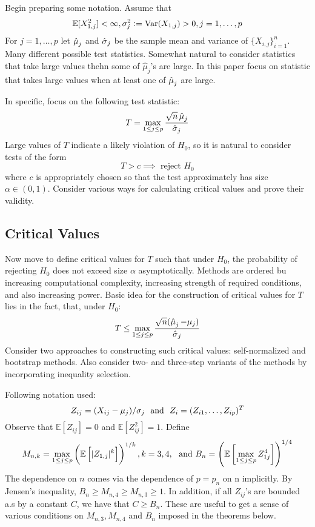 Begin preparing some notation. Assume that 
\begin{equation}
	\label{eq:CCK-12}
	\mathbb{E}[X_{1,j}^2] < \infty, \sigma_j^2 := \operatorname{Var}(X_{1,j}) > 0, j = 1,\dots, p
\end{equation}
For $j = 1,\dots,p$ let $\operatorname{\hat{\mu}}_j$ and $\operatorname{\hat{\sigma}}_j$ be the sample mean and variance of $\{X_{i,j}\}_{i=1}^n$. Many different possible test statistics. Somewhat natural to consider statistics that take large values thehn some of $\hat{\mu}_j$'s are large. In this paper focus on statistic that takes large values when at least one of $\operatorname{\hat{\mu}}_j$ are large. 

In specific, focus on the following test statistic:
\begin{equation}
	\label{2:testStat}
	T = \max_{1\leq j \leq p}\frac{\sqrt{n}\operatorname{\hat{\mu}}_j}{\operatorname{\hat{\sigma}}_j}
\end{equation}
Large values of $T$ indicate a likely violation of $H_0$, so it is natural to consider tests of the form 
\[T > c \implies \text{ reject } H_0\]
where $c$ is appropriately chosen so that the test approximately has size $\alpha \in (0,1)$. Consider various ways for calculating critical values and prove their validity. 

\subsection{Critical Values}

Now move to define critical values for $T$ such that under $H_0$, the probability of rejecting $H_0$ does not exceed size $\alpha$ asymptotically. Methods are ordered bu increasing computational complexity, increasing strength of required conditions, and also increasing power. Basic idea for the construction of critical values for $T$ lies in the fact, that, under $H_0$:
\[T \leq \max_{1\leq j \leq p} \frac{\sqrt{n}(\operatorname{\hat{\mu}}_j - \mu_j)}{\operatorname{\hat{\sigma}}_j} \]
Consider two approaches to constructing such critical values: self-normalized and bootstrap methods. Also consider two- and three-step variants of the methods by incorporating inequality selection. 

Following notation used:
\[Z_{ij} = (X_{ij} - \mu_j)/\sigma_j\hbox{ }\text{ and }\hbox{ }Z_i = (Z_{i1}, \dots, Z_{ip})^T \]
Observe that $\mathbb{E}[Z_{ij}] = 0$ and $\mathbb{E}[Z_{ij}^2] = 1$. Define 
\[M_{n,k} = \max_{1\leq j \leq p}\left( \mathbb{E}\left[|Z_{1,j}|^k\right]   \right)^{1/k},k = 3,4,\hbox{ }\text{ and }B_n = \left(\mathbb{E}\left[\max_{1\leq j \leq p} Z_{1j}^4     \right]   \right)^{1/4} \]
The dependence on $n$ comes via the dependence of $p = p_n$ on n implicitly. By Jensen's inequality, $B_n \geq M_{n,4} \geq M_{n,3} \geq 1$. In addition, if all $Z_{ij}$'s are bounded a.s by a constant $C$, we have that $C \geq B_n$. These are useful to get a sense of various conditions on $M_{n,3}, M_{n,4}$ and $B_n$ imposed in the theorems below. 

